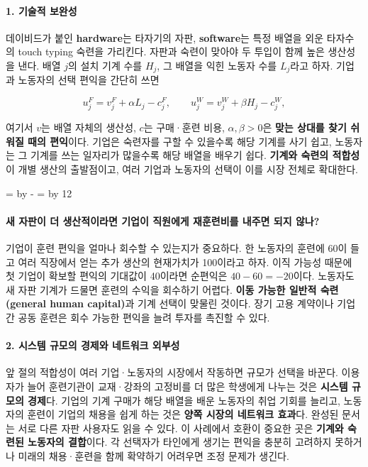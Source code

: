\documentclass[10pt,a4paper]{article}
\newcommand{\ReserveQuestionSpace}{%
  \par\begingroup
  \dimen0=\pagegoal \advance\dimen0 by -\pagetotal
  \dimen2=\baselineskip \multiply\dimen2 by 12
  \ifdim\dimen0<\dimen2 \newpage\fi
  \endgroup}
\begin{document}
\paragraph{1. 기술적 보완성}

데이비드가 붙인 \textbf{hardware}는 타자기의 자판, \textbf{software}는 특정 배열을 외운 타자수의 touch typing 숙련을 가리킨다. 자판과 숙련이 맞아야 두 투입이 함께 높은 생산성을 낸다. 배열 $j$의 설치 기계 수를 $H_j$, 그 배열을 익힌 노동자 수를 $L_j$라고 하자. 기업과 노동자의 선택 편익을 간단히 쓰면\par

\[
u_j^F=v_j^F+\alpha L_j-c_j^F,\qquad
u_j^W=v_j^W+\beta H_j-c_j^W,
\]

여기서 $v$는 배열 자체의 생산성, $c$는 구매·훈련 비용, $\alpha,\beta>0$은 \textbf{맞는 상대를 찾기 쉬워질 때의 편익}이다. 기업은 숙련자를 구할 수 있을수록 해당 기계를 사기 쉽고, 노동자는 그 기계를 쓰는 일자리가 많을수록 해당 배열을 배우기 쉽다. \textbf{기계와 숙련의 적합성}이 개별 생산의 출발점이고, 여러 기업과 노동자의 선택이 이를 시장 전체로 확대한다.\par

\ReserveQuestionSpace
\paragraph{새 자판이 더 생산적이라면 기업이 직원에게 재훈련비를 내주면 되지 않나?}
기업이 훈련 편익을 얼마나 회수할 수 있는지가 중요하다. 한 노동자의 훈련에 60이 들고 여러 직장에서 얻는 추가 생산의 현재가치가 100이라고 하자. 이직 가능성 때문에 첫 기업이 확보할 편익의 기대값이 40이라면 순편익은 $40-60=-20$이다. 노동자도 새 자판 기계가 드물면 훈련의 수익을 회수하기 어렵다. \textbf{이동 가능한 일반적 숙련(general human capital)}과 기계 선택이 맞물린 것이다. 장기 고용 계약이나 기업 간 공동 훈련은 회수 가능한 편익을 늘려 투자를 촉진할 수 있다.\par

\paragraph{2. 시스템 규모의 경제와 네트워크 외부성}

앞 절의 적합성이 여러 기업·노동자의 시장에서 작동하면 규모가 선택을 바꾼다. 이용자가 늘어 훈련기관이 교재·강좌의 고정비를 더 많은 학생에게 나누는 것은 \textbf{시스템 규모의 경제}다. 기업의 기계 구매가 해당 배열을 배운 노동자의 취업 기회를 늘리고, 노동자의 훈련이 기업의 채용을 쉽게 하는 것은 \textbf{양쪽 시장의 네트워크 효과}다. 완성된 문서는 서로 다른 자판 사용자도 읽을 수 있다. 이 사례에서 호환이 중요한 곳은 \textbf{기계와 숙련된 노동자의 결합}이다. 각 선택자가 타인에게 생기는 편익을 충분히 고려하지 못하거나 미래의 채용·훈련을 함께 확약하기 어려우면 조정 문제가 생긴다.\par
\end{document}
